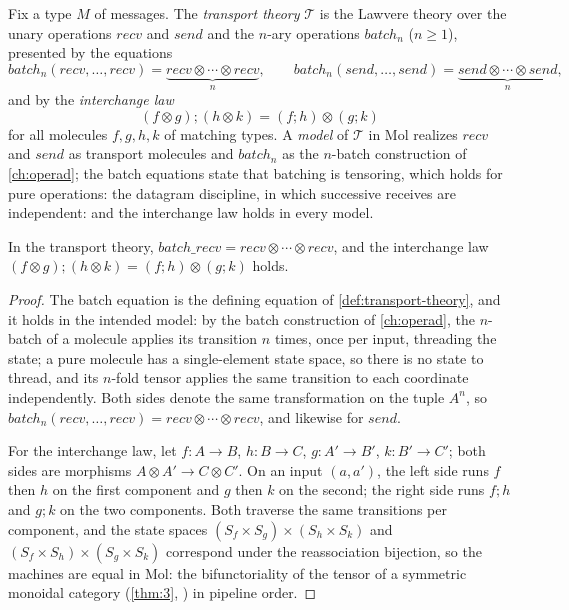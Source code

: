 \begin{definition}
\label{def:transport-theory}
Fix a type $M$ of messages. The \emph{transport theory} $\mathcal{T}$ is
the Lawvere theory over the unary operations $\mathit{recv}$ and
$\mathit{send}$ and the $n$-ary operations $\mathit{batch}_{n}$
($n \geq 1$), presented by the equations
\[
\mathit{batch}_{n} (\mathit{recv},\ldots,\mathit{recv})
= \underbrace{\mathit{recv} \otimes \cdots \otimes \mathit{recv}}_{n},
\qquad
\mathit{batch}_{n} (\mathit{send},\ldots,\mathit{send})
= \underbrace{\mathit{send} \otimes \cdots \otimes \mathit{send}}_{n},
\]
and by the \emph{interchange law}
\[
(f \otimes g);(h \otimes k) = (f;h) \otimes (g;k)
\]
for all molecules $f,g,h,k$ of matching types. A \emph{model} of
$\mathcal{T}$ in Mol realizes $\mathit{recv}$ and $\mathit{send}$ as
transport molecules and $\mathit{batch}_{n}$ as the $n$-batch construction
of \autoref{ch:operad}; the batch equations state that batching is
tensoring, which holds for pure operations: the datagram discipline, in
which successive receives are independent: and the interchange law holds
in every model.
\end{definition}

\begin{theorem}\label{thm:11}
In the transport theory, $\mathit{batch\_recv} = \mathit{recv} \otimes
\cdots \otimes \mathit{recv}$, and the interchange law
$(f \otimes g);(h \otimes k) = (f;h) \otimes (g;k)$ holds.
\end{theorem}

\begin{proof}
The batch equation is the defining equation of
\autoref{def:transport-theory}, and it holds in the intended model: by the
batch construction of \autoref{ch:operad}, the $n$-batch of a molecule
applies its transition $n$ times, once per input, threading the state; a
pure molecule has a single-element state space, so there is no state to
thread, and its $n$-fold tensor applies the same transition to each
coordinate independently. Both sides denote the same transformation on the
tuple $A^{n}$, so $\mathit{batch}_{n} (\mathit{recv},\ldots,\mathit{recv})
= \mathit{recv} \otimes \cdots \otimes \mathit{recv}$, and likewise for
$\mathit{send}$.

For the interchange law, let $f : A \to B$, $h : B \to C$, $g : A' \to B'$,
$k : B' \to C'$; both sides are morphisms $A \otimes A' \to C \otimes C'$.
On an input $(a,a')$, the left side runs $f$ then $h$ on the first
component and $g$ then $k$ on the second; the right side runs $f;h$ and
$g;k$ on the two components. Both traverse the same transitions per
component, and the state spaces $(S_{f} \times S_{g}) \times (S_{h} \times
S_{k})$ and $(S_{f} \times S_{h}) \times (S_{g} \times S_{k})$ correspond
under the reassociation bijection, so the machines are equal in Mol: the
bifunctoriality of the tensor of a symmetric monoidal category
(\autoref{thm:3}, \cite{maclane}) in pipeline order.
\end{proof}

